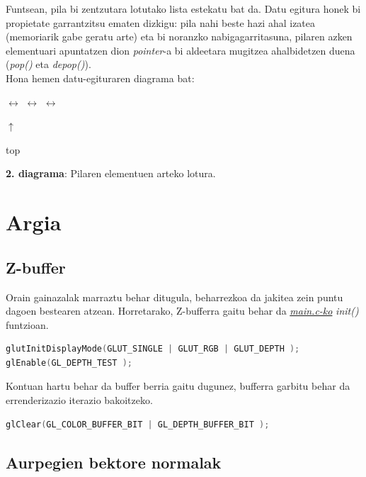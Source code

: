 \documentclass[12pt]{article}
\newcommand{\fitxategi}[1] {\underline{\textit{#1}}}
\newcommand{\metodo}[1] {\textit{#1}}
\begin{document}
Funtsean, pila bi zentzutara lotutako lista estekatu bat da. Datu egitura honek bi propietate garrantzitsu ematen dizkigu: pila nahi beste hazi ahal izatea (memoriarik gabe geratu arte) eta bi noranzko nabigagarritasuna, pilaren azken elementuari apuntatzen dion \textit{pointer}-a bi aldeetara mugitzea ahalbidetzen duena (\metodo{pop()} eta \metodo{depop()}).\\
Hona hemen datu-egituraren diagrama bat:

\begin{center}

 $\leftrightarrow$  $\leftrightarrow$  $\leftrightarrow$ 

\hspace{5.5cm} $\uparrow$

\hspace{5.5cm} top

\textbf{2. diagrama}: Pilaren elementuen arteko lotura.
\end{center}




\section{Argia}

\subsection{Z-buffer}

Orain gainazalak marraztu behar ditugula, beharrezkoa da jakitea zein puntu dagoen bestearen atzean. Horretarako, Z-bufferra gaitu behar da \fitxategi{main.c-ko} \metodo{init()} funtzioan.

\begin{lstlisting}[language=C]
glutInitDisplayMode(GLUT_SINGLE | GLUT_RGB | GLUT_DEPTH );
glEnable(GL_DEPTH_TEST );
\end{lstlisting}

Kontuan hartu behar da buffer berria gaitu dugunez, bufferra garbitu behar da errenderizazio iterazio bakoitzeko.

\begin{lstlisting}[language=C]
glClear(GL_COLOR_BUFFER_BIT | GL_DEPTH_BUFFER_BIT );
\end{lstlisting}

\subsection{Aurpegien bektore normalak}
\end{document}

